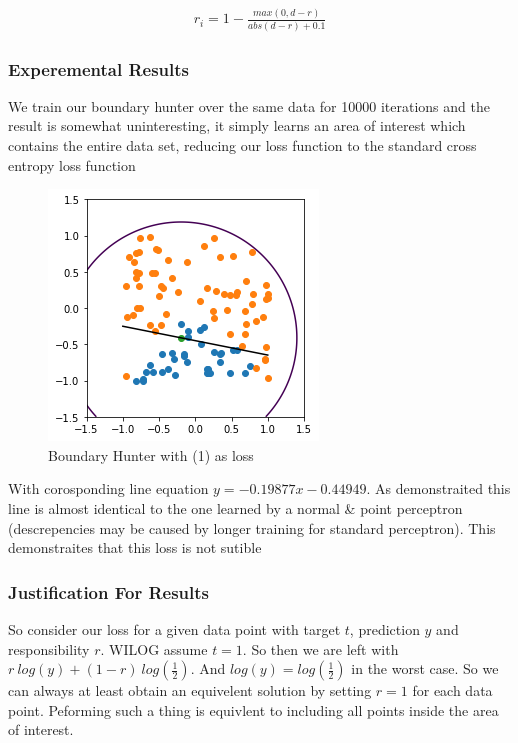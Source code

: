\documentclass{article}
\begin{document}
\begin{align}
r_i = 1 - \frac{max(0, d-r)}{abs(d-r) + 0.1}
\end{align}


\subsubsection{Experemental Results}
We train our boundary hunter over the same data for 10000 iterations and the result is somewhat uninteresting, it simply learns an area of interest which contains the entire data set, reducing our loss function to the standard cross entropy loss function 

\begin{figure}[H]
\centering
  \begin{minipage}[b]{0.4\textwidth}
    \includegraphics[width=\textwidth]{BoundaryHunter-Attempt1-01.png}
    \caption{Boundary Hunter with (1) as loss}
  \end{minipage}
  \hfill
\end{figure}

With corosponding line equation $y = -0.19877x -0.44949$. As demonstraited this line is almost identical to the one learned by a normal  \& point perceptron (descrepencies may be caused by longer training for standard perceptron). This demonstraites that this loss is not sutible

\subsubsection{Justification For Results}
So consider our loss for a given data point with target $t$, prediction $y$ and responsibility $r$. WILOG assume $t = 1$. So then we are left with $r\ log(y) + (1-r)\ log(\frac{1}{2})$. And $log(y) = log(\frac{1}{2})$ in the worst case. So we can always at least obtain an equivelent solution by setting $r = 1$ for each data point. Peforming such a thing is equivlent to including all points inside the area of interest.  
\end{document}

